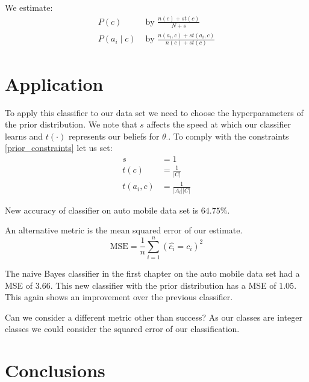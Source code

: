 We estimate:
\begin{align}
	P(c) & \text{ by } \frac{n(c) + st(c)}{N + s} \\
	P(a_i \mid c) & \text{ by } \frac{n(a_i, c) + st(a_i, c)}{n(c) + st(c)}
\end{align}

\section{Application}{}

To apply this classifier to our data set we need to choose the hyperparameters of the prior distribution.
We note that $s$ affects the speed at which our classifier learns and $t(\cdot)$ represents our beliefs for $\theta_\cdot$.
To comply with the constraints \ref{prior_constraints} let us set:
\begin{align}
	s & = 1 \\
	t(c) & = \frac{1}{|C|} \\
	t(a_i, c) & = \frac{1}{|A_i||C|}
\end{align}

New accuracy of classifier on auto mobile data set is $64.75\%$.

An alternative metric is the mean squared error of our estimate.
\begin{equation}
	\text{MSE} = \frac{1}{n}\sum_{i=1}^n(\hat{c_i} = c_i)^2
\end{equation}

The naive Bayes classifier in the first chapter on the auto mobile data set had a MSE of $3.66$.
This new classifier with the prior distribution has a MSE of $1.05$.
This again shows an improvement over the previous classifier.


Can we consider a different metric other than success? As our classes are integer classes we could consider the squared error of our classification.

\section{Conclusions}